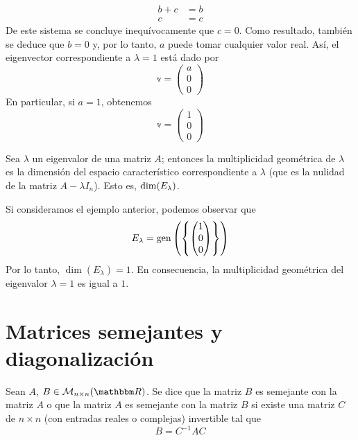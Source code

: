 \begin{example}
\begin{align*}
        b + c & = b \\
        c & = c
    \end{align*}
    De este sistema se concluye inequívocamente que $c = 0$. Como resultado, también se deduce que $b = 0$ y, por lo tanto, $a$ puede tomar cualquier valor real. Así, el eigenvector correspondiente a $\lambda = 1$ está dado por
    $$\mathbb{v} = \begin{pmatrix}
        a \\
        0 \\
        0
    \end{pmatrix}$$
    En particular, si $a = 1$, obtenemos
    $$\mathbb{v} = \begin{pmatrix}
        1 \\
        0 \\
        0
    \end{pmatrix}$$
\end{example}

\begin{definition}
    Sea $\lambda$ un eigenvalor de una matriz $A$; entonces la multiplicidad geométrica de $\lambda$ es la dimensión del espacio característico correspondiente a $\lambda$ (que es la nulidad de la matriz $A - \lambda I_n$). Esto es, $\operatorname{dim} (E_{\lambda})$.
\end{definition}

\begin{example}
    Si consideramos el ejemplo anterior, podemos observar que
    $$E_{\lambda} = \operatorname{gen} \left(\left\{ \begin{pmatrix}
        1 \\
        0 \\
        0
    \end{pmatrix} \right\}\right)$$
    Por lo tanto, $\dim(E_{\lambda}) = 1$. En consecuencia, la multiplicidad geométrica del eigenvalor $\lambda = 1$ es igual a $1$.
\end{example}

\section{Matrices semejantes y diagonalización}

\begin{definition}
    Sean $A$, $B \in \mathcal{M}_{n \times n}(\RR)$. Se dice que la matriz $B$ es semejante con la matriz $A$ o que la matriz $A$ es semejante con la matriz $B$ si existe una matriz $C$ de $n \times n$ (con entradas reales o complejas) invertible tal que
    $$B = C^{-1} A C$$
\end{definition}

